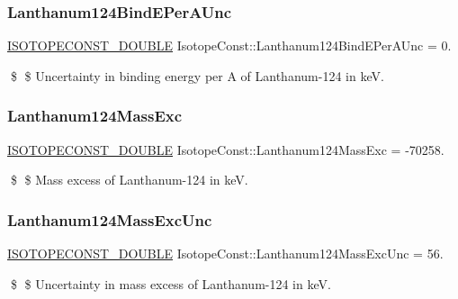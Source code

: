 \subsubsection{\texorpdfstring{Lanthanum124\+Bind\+E\+Per\+A\+Unc}{Lanthanum124BindEPerAUnc}}
{\footnotesize\ttfamily \mbox{\hyperlink{group___isotope_const-_macros_ga8f45a7272ce02c0b4c65c44636ed719a}{I\+S\+O\+T\+O\+P\+E\+C\+O\+N\+S\+T\+\_\+\+D\+O\+U\+B\+LE}} Isotope\+Const\+::\+Lanthanum124\+Bind\+E\+Per\+A\+Unc = 0.}

\$ \$ Uncertainty in binding energy per A of Lanthanum-\/124 in keV. \mbox{\label{group___isotope_const-_lanthanum-_la124_ga5eeccaaa5841c6e09c3186df62642c3d}} 
\subsubsection{\texorpdfstring{Lanthanum124\+Mass\+Exc}{Lanthanum124MassExc}}
{\footnotesize\ttfamily \mbox{\hyperlink{group___isotope_const-_macros_ga8f45a7272ce02c0b4c65c44636ed719a}{I\+S\+O\+T\+O\+P\+E\+C\+O\+N\+S\+T\+\_\+\+D\+O\+U\+B\+LE}} Isotope\+Const\+::\+Lanthanum124\+Mass\+Exc = -\/70258.}

\$ \$ Mass excess of Lanthanum-\/124 in keV. \mbox{\label{group___isotope_const-_lanthanum-_la124_ga35300c3b21cfdf749e0fa19719609f02}} 
\subsubsection{\texorpdfstring{Lanthanum124\+Mass\+Exc\+Unc}{Lanthanum124MassExcUnc}}
{\footnotesize\ttfamily \mbox{\hyperlink{group___isotope_const-_macros_ga8f45a7272ce02c0b4c65c44636ed719a}{I\+S\+O\+T\+O\+P\+E\+C\+O\+N\+S\+T\+\_\+\+D\+O\+U\+B\+LE}} Isotope\+Const\+::\+Lanthanum124\+Mass\+Exc\+Unc = 56.}

\$ \$ Uncertainty in mass excess of Lanthanum-\/124 in keV. \mbox{\label{group___isotope_const-_lanthanum-_la124_ga6c10cba53639fa7f0399c7d0ad7390d8}} 
